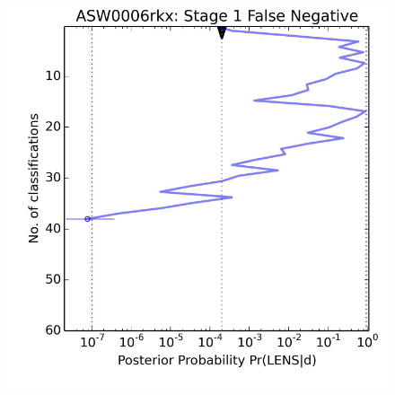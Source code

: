 \documentclass[useAMS,usenatbib,a4paper]{mn2e}
\begin{document}
\begin{figure}
\begin{minipage}{\linewidth}
\begin{minipage}[t]{0.47\linewidth}
\begin{minipage}{0.46\linewidth}
    \end{minipage}\hfill
    \begin{minipage}{0.50\linewidth}
      \centering\includegraphics[width=\linewidth]{ASW0006rkx_stage1_trajectory.pdf}
    \end{minipage}
  \end{minipage}
\end{minipage}

\vspace{\baselineskip}


\end{figure}
\end{document}
